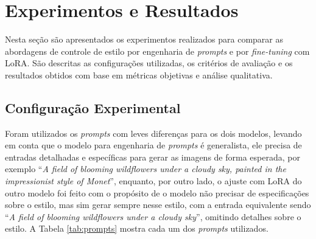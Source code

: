 \section{Experimentos e Resultados}

Nesta seção são apresentados os experimentos realizados para comparar as abordagens de controle de estilo por engenharia de \textit{prompts} e por \textit{fine-tuning} com LoRA. São descritas as configurações utilizadas, os critérios de avaliação e os resultados obtidos com base em métricas objetivas e análise qualitativa.

\subsection{Configuração Experimental}

Foram utilizados os \textit{prompts} com leves diferenças para os dois modelos, levando em conta que o modelo para engenharia de \textit{prompts} é generalista, ele precisa de entradas detalhadas e específicas para gerar as imagens de forma esperada, por exemplo ``\textit{A field of blooming wildflowers under a cloudy sky, painted in the impressionist style of Monet}'', enquanto, por outro lado, o ajuste com LoRA do outro modelo foi feito com o propósito de o modelo não precisar de especificações sobre o estilo, mas sim gerar sempre nesse estilo, com a entrada equivalente sendo ``\textit{A field of blooming wildflowers under a cloudy sky}'', omitindo detalhes sobre o estilo. A Tabela \ref{tab:prompts} mostra cada um dos \textit{prompts} utilizados.

